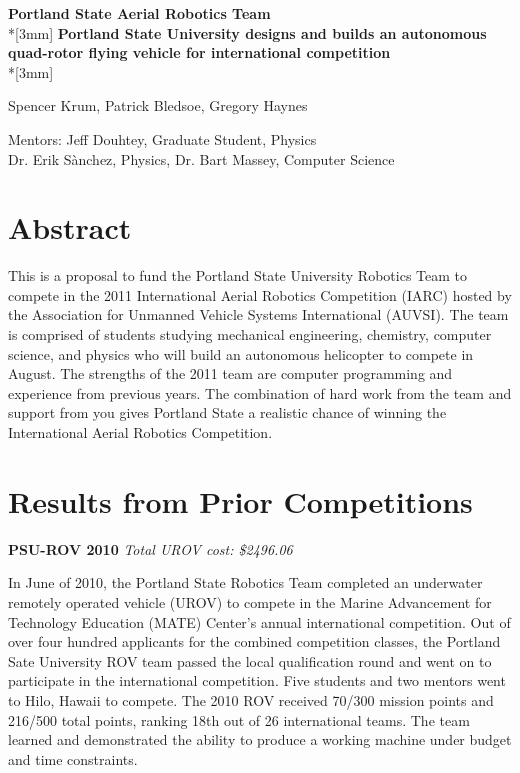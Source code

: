 \documentclass{article}
\begin{document}
\begin{center}
{\Large{\bf Portland State Aerial Robotics Team}}\\*[3mm]
{\bf Portland State University designs and builds an autonomous quad-rotor flying vehicle for international competition} \\*[3mm]

Spencer Krum, Patrick Bledsoe, Gregory Haynes





Mentors: Jeff Douhtey, Graduate Student, Physics
\\Dr. Erik S\`anchez, Physics, Dr. Bart Massey, Computer Science


\end{center}


\section{Abstract} This is a  proposal to fund the Portland State University Robotics Team to compete in the 2011 International Aerial Robotics Competition (IARC) hosted by the Association for Unmanned Vehicle Systems International (AUVSI). The team is comprised of students studying mechanical engineering,
 chemistry, computer science, and physics who will build an autonomous helicopter to compete in August.  The strengths of the 2011 team are computer programming and experience from previous years. The combination of hard work 
from the team and support from you gives Portland State a realistic chance of winning the International Aerial Robotics Competition.  


\section{Results from Prior Competitions}

\noindent
{\bf PSU-ROV 2010}
{\it Total UROV cost: \$2496.06}

In June of 2010, the Portland State Robotics Team completed an underwater remotely operated vehicle (UROV) to compete in the Marine Advancement for Technology Education (MATE) Center's annual international competition. Out of over four hundred applicants for the combined competition classes, the Portland Sate University ROV team passed the local qualification round and went on to participate in the international competition. 
Five students and two mentors went to Hilo, Hawaii to compete. The 2010 ROV received 70/300 mission points and 216/500 total points, 
ranking 18th out of 26 international teams. The team learned and demonstrated the ability to produce a working machine under budget and time constraints.
\end{document}
